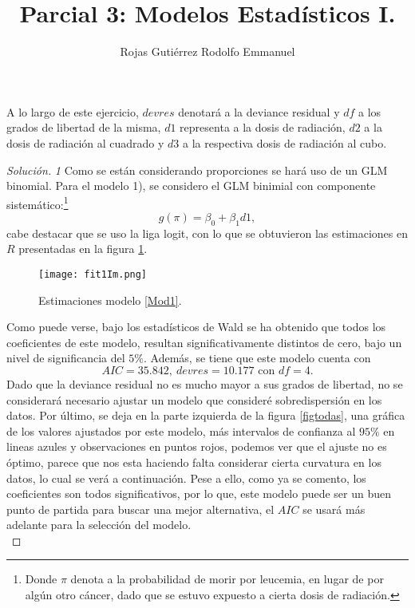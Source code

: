 \documentclass[10.5pt,notitlepage]{article}
\title{Parcial 3: Modelos Estadísticos I.}
\author{Rojas Gutiérrez Rodolfo Emmanuel}
\renewcommand{\qedsymbol}{$\blacksquare$}
\newenvironment{solucion}
  {\begin{proof}[Solución]}
  {\end{proof}}
\theoremstyle{plain}
\newenvironment{rem}
  {\pushQED{\qed}\renewcommand{\qedsymbol}{$\triangle$}\remarkex}
  {\popQED\endremarkex}
\begin{document}
\maketitle

\setcounter{exo}{0}
\begin{exo}

\end{exo}
\begin{rem}
A lo largo de este ejercicio, \(devres\) denotará a la deviance residual y \(df\) a los grados de libertad de la misma, \(d1\) representa a la dosis de radiación, \(d2\) a la dosis de radiación al cuadrado y \(d3\) a la respectiva dosis de radiación al cubo.
\end{rem}
\begin{solucion}
\textit{1} Como se están considerando proporciones se hará uso de un GLM binomial. Para el modelo 1), se considero el GLM binimial con componente sistemático:\footnote{Donde \(\pi\) denota a la probabilidad de morir por leucemia, en lugar de por algún otro cáncer, dado que se estuvo expuesto a cierta dosis de radiación. }
\begin{equation}\label{Mod1}
    g(\pi) = \beta_0 + \beta_{1}d1,
\end{equation}
cabe destacar que se uso la liga logit, con lo que se obtuvieron las estimaciones en \(R\) presentadas en la figura \ref{fig1}.
\begin{figure}[htb]
    \centering
    \texttt{[image: fit1Im.png]}
    \caption{Estimaciones modelo \eqref{Mod1}.}
    \label{fig1}
\end{figure}
Como puede verse, bajo los estadísticos de Wald se ha obtenido que todos los coeficientes de este modelo, resultan significativamente distintos de cero, bajo un nivel de significancia del \(5\%\). Además, se tiene que este modelo cuenta con 
\begin{equation}\label{AIC1}
    AIC = 35.842, \ devres = 10.177 \text{ con } df = 4.  
\end{equation}
Dado que la deviance residual no es mucho mayor a sus grados de libertad, no se considerará necesario ajustar un modelo que consideré sobredispersión en los datos. Por último, se deja en la parte izquierda de la figura \ref{figtodas}, una gráfica de los valores ajustados por este modelo, más intervalos de confianza al \(95\%\) en lineas azules y observaciones en puntos rojos, podemos ver que el ajuste no es óptimo, parece que nos esta haciendo falta considerar cierta curvatura en los datos, lo cual se verá a continuación. Pese a ello, como ya se comento, los coeficientes son todos significativos, por lo que, este modelo puede ser un buen punto de partida para buscar una mejor alternativa, el \(AIC\) se usará más adelante para la selección del modelo. \\




\end{solucion}
\end{document}
